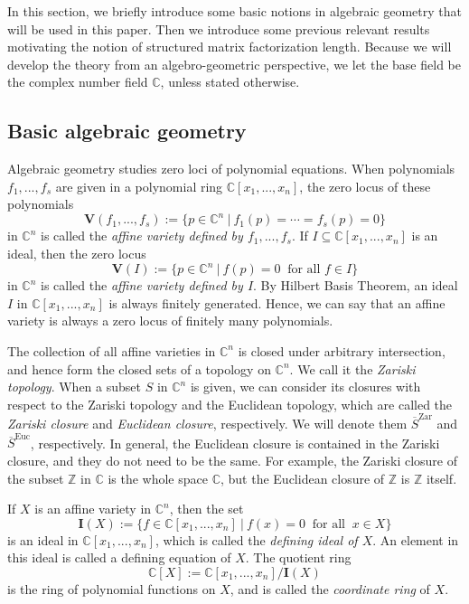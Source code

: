 \documentclass[reqno]{amsart}
\theoremstyle{definition}
\numberwithin{equation}{section}
\begin{document}
In this section, we briefly introduce some basic notions in algebraic geometry that will be used in this paper. Then we introduce some previous relevant results motivating the notion of structured matrix factorization length. Because we will develop the theory from an algebro-geometric perspective, we let the base field be the complex number field $\mathbb{C}$, unless stated otherwise.

\subsection{Basic algebraic geometry}

Algebraic geometry studies zero loci of polynomial equations. 
When polynomials $f_1,...,f_s$ are given in a polynomial ring $\mathbb{C}[x_1,...,x_n]$, the zero locus of these polynomials
\begin{equation*}
    \mathbf{V}(f_1,...,f_s):=\{p \in \mathbb{C}^n~|~f_1(p)=\cdots=f_s(p)=0\}
\end{equation*}
in $\mathbb{C}^n$ is called the \emph{affine variety defined by $f_1,...,f_s$}. If $I \subseteq \mathbb{C}[x_1,...,x_n]$ is an ideal, then the zero locus
\begin{equation*}
    \mathbf{V}(I):=\{p \in \mathbb{C}^n~|~f(p)=0~\text{ for all } f\in I\}
\end{equation*}
in $\mathbb{C}^n$ is called the \emph{affine variety defined by $I$}. By Hilbert Basis Theorem, an ideal $I$ in $\mathbb{C}[x_1,...,x_n]$ is always finitely generated. Hence, we can say that an affine variety is always a zero locus of finitely many polynomials.

The collection of all affine varieties in $\mathbb{C}^n$ is closed under arbitrary intersection, and hence form the closed sets of a topology on $\mathbb{C}^n$. We call it the \emph{Zariski topology}. When a subset $S$ in $\mathbb{C}^n$ is given, we can consider its closures with respect to the Zariski topology and the Euclidean topology, which are called the \emph{Zariski closure} and \emph{Euclidean closure}, respectively. We will denote them $\overline{S}^{\text{Zar}}$ and $\overline{S}^{\text{Euc}}$, respectively. In general, the Euclidean closure is contained in the Zariski closure, and they do not need to be the same. For example, the Zariski closure of the subset $\mathbb{Z}$ in $\mathbb{C}$ is the whole space $\mathbb{C}$, but the Euclidean closure of $\mathbb{Z}$ is $\mathbb{Z}$ itself.

If $X$ is an affine variety in $\mathbb{C}^n$, then the set
\begin{equation*}
    \mathbf{I}(X):=\{f \in \mathbb{C}[x_1,...,x_n]~|~f(x)=0~\text{ for all }~x \in X\}
\end{equation*}
is an ideal in $\mathbb{C}[x_1,...,x_n]$, which is called the \emph{defining ideal of $X$}. An element in this ideal is called a defining equation of $X$. The quotient ring
\begin{equation*}
    \mathbb{C}[X]:=\mathbb{C}[x_1,...,x_n]/\mathbf{I}(X)
\end{equation*}
is the ring of polynomial functions on $X$, and is called the \emph{coordinate ring} of $X$.
\end{document}
